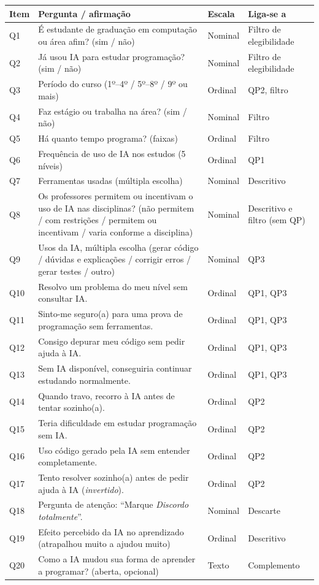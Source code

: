 \documentclass[11pt,a4paper]{article}
\begin{document}
\begin{center}
\small
\begin{tabularx}{\textwidth}{@{}l X l >{\raggedright\arraybackslash}p{3.6cm}@{}}
\toprule
\textbf{Item} & \textbf{Pergunta / afirmação} & \textbf{Escala} & \textbf{Liga-se a} \\
\midrule
Q1 & É estudante de graduação em computação ou área afim? (sim / não) & Nominal & Filtro de elegibilidade \\
Q2 & Já usou IA para estudar programação? (sim / não) & Nominal & Filtro de elegibilidade \\
Q3 & Período do curso (1º--4º / 5º--8º / 9º ou mais) & Ordinal & QP2, filtro \\
Q4 & Faz estágio ou trabalha na área? (sim / não) & Nominal & Filtro \\
Q5 & Há quanto tempo programa? (faixas) & Ordinal & Filtro \\
Q6 & Frequência de uso de IA nos estudos (5 níveis) & Ordinal & QP1 \\
Q7 & Ferramentas usadas (múltipla escolha) & Nominal & Descritivo \\
Q8 & Os professores permitem ou incentivam o uso de IA nas disciplinas? (não permitem / com restrições / permitem ou incentivam / varia conforme a disciplina) & Nominal & Descritivo e filtro (sem QP) \\
Q9 & Usos da IA, múltipla escolha (gerar código / dúvidas e explicações / corrigir erros / gerar testes / outro) & Nominal & QP3 \\
Q10 & Resolvo um problema do meu nível sem consultar IA. & Ordinal & QP1, QP3 \\
Q11 & Sinto-me seguro(a) para uma prova de programação sem ferramentas. & Ordinal & QP1, QP3 \\
Q12 & Consigo depurar meu código sem pedir ajuda à IA. & Ordinal & QP1, QP3 \\
Q13 & Sem IA disponível, conseguiria continuar estudando normalmente. & Ordinal & QP1, QP3 \\
Q14 & Quando travo, recorro à IA antes de tentar sozinho(a). & Ordinal & QP2 \\
Q15 & Teria dificuldade em estudar programação sem IA. & Ordinal & QP2 \\
Q16 & Uso código gerado pela IA sem entender completamente. & Ordinal & QP2 \\
Q17 & Tento resolver sozinho(a) antes de pedir ajuda à IA (\emph{invertido}). & Ordinal & QP2 \\
Q18 & Pergunta de atenção: ``Marque \emph{Discordo totalmente}''. & Nominal & Descarte \\
Q19 & Efeito percebido da IA no aprendizado (atrapalhou muito a ajudou muito) & Ordinal & Descritivo \\
Q20 & Como a IA mudou sua forma de aprender a programar? (aberta, opcional) & Texto & Complemento \\
\bottomrule
\end{tabularx}
\end{center}
\end{document}
